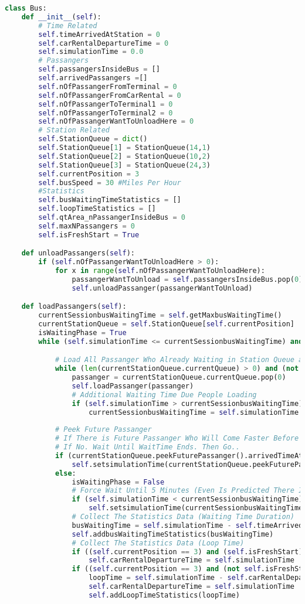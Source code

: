 \documentclass{article}
\begin{document}
\begin{lstlisting}[language=Python]
class Bus:
	def __init__(self):
		# Time Related
		self.timeArrivedAtStation = 0
		self.carRentalDepartureTime = 0
		self.simulationTime = 0.0
		# Passangers
		self.passangersInsideBus = []
		self.arrivedPassangers =[]
		self.nOfPassangerFromTerminal = 0
		self.nOfPassangerFromCarRental = 0
		self.nOfPassangerToTerminal1 = 0
		self.nOfPassangerToTerminal2 = 0
		self.nOfPassangerWantToUnloadHere = 0
		# Station Related
		self.StationQueue = dict()
		self.StationQueue[1] = StationQueue(14,1)
		self.StationQueue[2] = StationQueue(10,2)
		self.StationQueue[3] = StationQueue(24,3)
		self.currentPosition = 3
		self.busSpeed = 30 #Miles Per Hour
		#Statistics
		self.busWaitingTimeStatistics = []
		self.loopTimeStatistics = []
		self.qtArea_nPassangerInsideBus = 0
		self.maxNPassangers = 0
		self.isFreshStart = True

	def unloadPassangers(self):
		if (self.nOfPassangerWantToUnloadHere > 0):
			for x in range(self.nOfPassangerWantToUnloadHere):
				passangerWantToUnload = self.passangersInsideBus.pop(0)
				self.unloadPassanger(passangerWantToUnload)

	def loadPassangers(self):
		currentSessionbusWaitingTime = self.getMaxbusWaitingTime()
		currentStationQueue = self.StationQueue[self.currentPosition]
		isWaitingPhase = True
		while (self.simulationTime <= currentSessionbusWaitingTime) and (not self.isFull()) and (isWaitingPhase):

			# Load All Passanger Who Already Waiting in Station Queue as Long Bus is Not Full
			while (len(currentStationQueue.currentQueue) > 0) and (not self.isFull()):
				passanger = currentStationQueue.currentQueue.pop(0)
				self.loadPassanger(passanger)
				# Additional Waiting Time Due People Loading
				if (self.simulationTime > currentSessionbusWaitingTime):
					currentSessionbusWaitingTime = self.simulationTime
			
			# Peek Future Passanger
			# If There is Future Passanger Who Will Come Faster Before WaitTime Ends. Wait...
			# If No. Wait Until WaitTime Ends. Then Go..
			if (currentStationQueue.peekFuturePassanger().arrivedTimeAtOriginStation <= currentSessionbusWaitingTime):
				self.setsimulationTime(currentStationQueue.peekFuturePassanger().arrivedTimeAtOriginStation)
			else:
				isWaitingPhase = False
				# Force Wait Until 5 Minutes (Even Is Predicted There Is No Passanger Will Come Anyway)
				if (self.simulationTime < currentSessionbusWaitingTime):
					self.setsimulationTime(currentSessionbusWaitingTime)
				# Collect The Statistics Data (Waiting Time Duration)	
				busWaitingTime = self.simulationTime - self.timeArrivedAtStation
				self.addbusWaitingTimeStatistics(busWaitingTime)
				# Collect The Statistics Data (Loop Time)
				if ((self.currentPosition == 3) and (self.isFreshStart)):
					self.carRentalDepartureTime = self.simulationTime
				if ((self.currentPosition == 3) and (not self.isFreshStart)):
					loopTime = self.simulationTime - self.carRentalDepartureTime
					self.carRentalDepartureTime = self.simulationTime
					self.addLoopTimeStatistics(loopTime)


\end{lstlisting}
\end{document}
